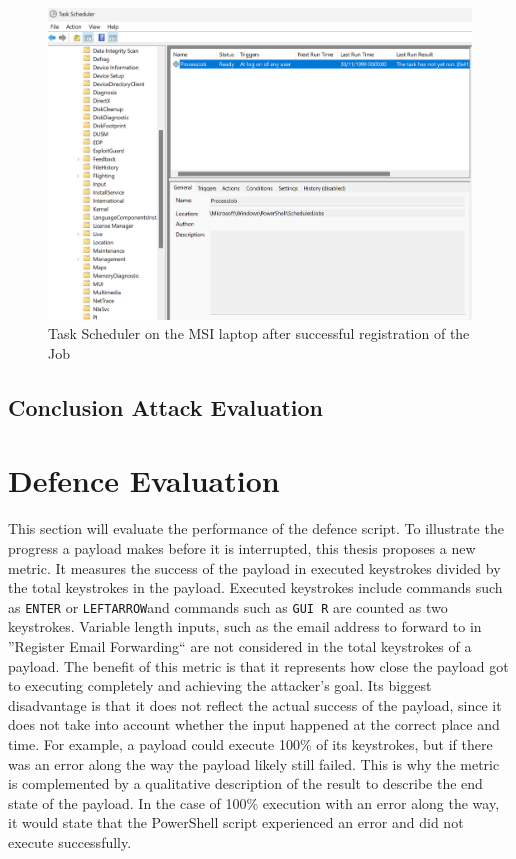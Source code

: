 \begin{figure}[H]
    \centering
    \includegraphics[width=0.5\linewidth]{visuals/task_scheduler_MSI.jpeg}
    \caption{Task Scheduler on the MSI laptop after successful registration of the Job}
    \label{fig:TaskScheduler}
\end{figure}



\subsection{Conclusion Attack Evaluation}


\section{Defence Evaluation} \label{defence evaluation}


This section will evaluate the performance of the defence script. To illustrate the progress a payload makes before it is interrupted, this thesis proposes a new metric. It measures the success of the payload in executed keystrokes divided by the total keystrokes in the payload. Executed keystrokes include commands such as \verb|ENTER| or \verb|LEFTARROW|and commands such as \verb|GUI R| are counted as two keystrokes. Variable length inputs, such as the email address to forward to in ''Register Email Forwarding`` are not considered in the total keystrokes of a payload. The benefit of this metric is that it represents how close the payload got to executing completely and achieving the attacker's goal. Its biggest disadvantage is that it does not reflect the actual success of the payload, since it does not take into account whether the input happened at the correct place and time. For example, a payload could execute 100\% of its keystrokes, but if there was an error along the way the payload likely still failed. This is why the metric is complemented by a qualitative description of the result to describe the end state of the payload. In the case of 100\% execution with an error along the way, it would state that the PowerShell script experienced an error and did not execute successfully. 

